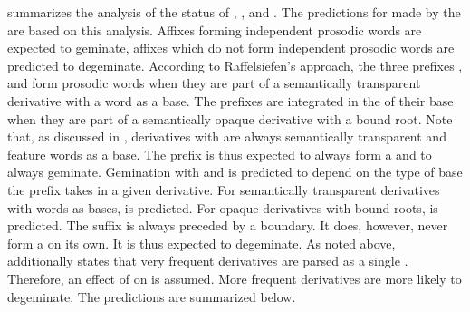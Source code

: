  summarizes the analysis of the  status of  , ,  and . The predictions for  made by the  are based on this analysis. Affixes forming independent prosodic words are expected to geminate, affixes which do not form independent prosodic words are predicted to degeminate.
According to Raffelsiefen's approach, the three prefixes ,  and  form prosodic words when they are part of a semantically transparent derivative with a word as a base. The prefixes are integrated in the  of their base when they are part of a semantically opaque derivative with a bound root. 
Note that, as discussed in , derivatives with  are always semantically transparent and feature words as a base. The prefix  is thus expected to always form a  and to always geminate. 
Gemination with  and  is predicted to depend on the type of base the prefix takes in a given derivative. For semantically transparent derivatives with words as bases,  is predicted. For opaque derivatives with bound roots,  is predicted.
The suffix  is always preceded by a  boundary. It does, however, never form a  on its own. It is thus expected to degeminate. 
As noted above, \cite{Raffelsiefen.1999} additionally states that very frequent derivatives are parsed as a single . Therefore, an effect of  on  is assumed. More frequent derivatives are more likely to degeminate. The predictions are summarized below.




